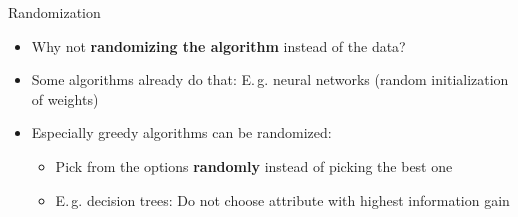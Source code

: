 \begin{frame}{Randomization}{}
	\begin{itemize}
		\item Why not \textbf{randomizing the algorithm} instead of the data?
		\item Some algorithms already do that: E.\,g. neural networks (random initialization of weights)
		\item Especially greedy algorithms can be randomized:
		\begin{itemize}
			\item Pick from the options \textbf{randomly} instead of picking the best one
			\item E.\,g. decision trees: Do not choose attribute with highest information gain
		\end{itemize}
	\end{itemize}
	
	\begin{boxBlueNoFrame}
	\end{boxBlueNoFrame}
\end{frame}


